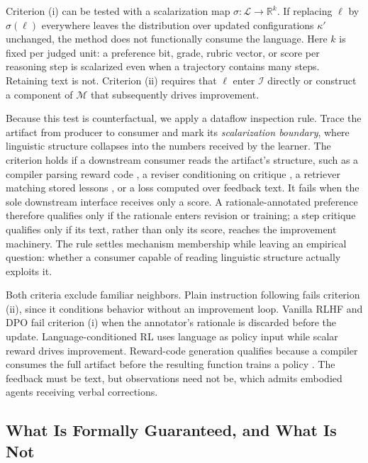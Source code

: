 Criterion (i) can be tested with a scalarization map $\sigma:\mathcal{L}\to\mathbb{R}^{k}$. If replacing $\ell$ by $\sigma(\ell)$ everywhere leaves the distribution over updated configurations $\kappa'$ unchanged, the method does not functionally consume the language. Here $k$ is fixed per judged unit: a preference bit, grade, rubric vector, or score per reasoning step is scalarized even when a trajectory contains many steps. Retaining text is not. Criterion (ii) requires that $\ell$ enter $\mathcal{I}$ directly or construct a component of $\mathcal{M}$ that subsequently drives improvement.

Because this test is counterfactual, we apply a dataflow inspection rule. Trace the artifact from producer to consumer and mark its \emph{scalarization boundary}, where linguistic structure collapses into the numbers received by the learner. The criterion holds if a downstream consumer reads the artifact's structure, such as a compiler parsing reward code \citep{ma2024eureka}, a reviser conditioning on critique \citep{madaan2023selfrefine}, a retriever matching stored lessons \citep{shinn2023reflexion}, or a loss computed over feedback text. It fails when the sole downstream interface receives only a score. A rationale-annotated preference therefore qualifies only if the rationale enters revision or training; a step critique qualifies only if its text, rather than only its score, reaches the improvement machinery. The rule settles mechanism membership while leaving an empirical question: whether a consumer capable of reading linguistic structure actually exploits it.

Both criteria exclude familiar neighbors. Plain instruction following fails criterion (ii), since it conditions behavior without an improvement loop. Vanilla RLHF \citep{ouyang2022training} and DPO \citep{rafailov2023direct} fail criterion (i) when the annotator's rationale is discarded before the update. Language-conditioned RL \citep{luketina2019survey} uses language as policy input while scalar reward drives improvement. Reward-code generation qualifies because a compiler consumes the full artifact before the resulting function trains a policy \citep{ma2024eureka}. The feedback must be text, but observations need not be, which admits embodied agents receiving verbal corrections.

\subsection{What Is Formally Guaranteed, and What Is Not}
\label{subsec:guarantees}

